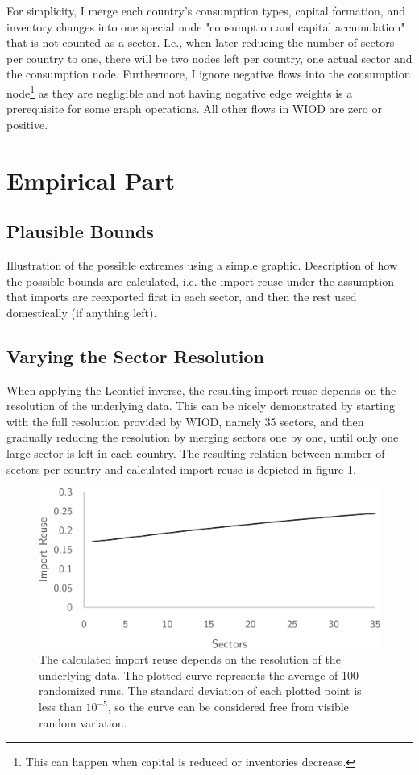 \documentclass[english]{uzhpub}
\begin{document}
For simplicity, I merge each country's consumption types, capital formation, and inventory changes into one special node "consumption and capital accumulation" that is not counted as a sector. I.e., when later reducing the number of sectors per country to one, there will be two nodes left per country, one actual sector and the consumption node. Furthermore, I ignore negative flows into the consumption node\footnote{This can happen when capital is reduced or inventories decrease.} as they are negligible and not having negative edge weights is a prerequisite for some graph operations. All other flows in WIOD are zero or positive.

\section{Empirical Part}

\subsection{Plausible Bounds}
Illustration of the possible extremes using a simple graphic. Description of how the possible bounds are calculated, i.e. the import reuse under the assumption that imports are reexported first in each sector, and then the rest used domestically (if anything left).

\subsection{Varying the Sector Resolution}
When applying the Leontief inverse, the resulting import reuse depends on the resolution of the underlying data. This can be nicely demonstrated by starting with the full resolution provided by WIOD, namely 35 sectors, and then gradually reducing the resolution by merging sectors one by one, until only one large sector is left in each country. The resulting relation between number of sectors per country and calculated import reuse is depicted in figure \ref{fig:resolution}.

\begin{figure}
\centering
\includegraphics[scale=0.5]{../data/resolution}
\caption{The calculated import reuse depends on the resolution of the underlying data. The plotted curve represents the average of 100 randomized runs. The standard deviation of each plotted point is less than $10^{-5}$, so the curve can be considered free from visible random variation.} \label{fig:resolution}
\end{figure}
\end{document}
